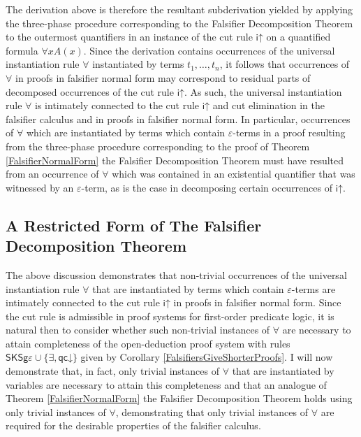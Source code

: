 \documentclass[10pt]{article}
\theoremstyle{definition}\newtheorem{remark}[theorem]{Remark}
\theoremstyle{definition}\newtheorem{example}[theorem]{Example}
\theoremstyle{definition}\newtheorem{definition}[theorem]{Definition}
\newcommand{\FalsifierCalculus}{{\mathsf{SKSg\varepsilon}}}
\newcommand{\iUp}{{\mathsf{i\mathord\uparrow}}}
\newcommand{\qcDown}{{\mathsf{qc\mathord\downarrow}}}
\begin{document}
	The derivation above is therefore the resultant subderivation yielded by applying the three-phase procedure corresponding to the Falsifier Decomposition Theorem to the outermost quantifiers in an instance of the cut rule $\iUp$ on a quantified formula $\forall x A(x)$. Since the derivation contains occurrences of the universal instantiation rule $\forall$ instantiated by terms $t_1, \dots, t_n$, it follows that occurrences of $\forall$ in proofs in falsifier normal form may correspond to residual parts of decomposed occurrences of the cut rule $\iUp$. As such, the universal instantiation rule $\forall$ is intimately connected to the cut rule $\iUp$ and cut elimination in the falsifier calculus and in proofs in falsifier normal form. In particular, occurrences of $\forall$ which are instantiated by terms which contain $\varepsilon$-terms in a proof resulting from the three-phase procedure corresponding to the proof of Theorem \ref{FalsifierNormalForm} the Falsifier Decomposition Theorem must have resulted from an occurrence of $\forall$ which was contained in an existential quantifier that was witnessed by an $\varepsilon$-term, as is the case in decomposing certain occurrences of $\iUp$.
	
	\subsection{A Restricted Form of The Falsifier Decomposition Theorem}\label{RestrictedFalsifierSection}

	The above discussion demonstrates that non-trivial occurrences of the universal instantiation rule $\forall$ that are instantiated by terms which contain $\varepsilon$-terms are intimately connected to the cut rule $\iUp$ in proofs in falsifier normal form. Since the cut rule is admissible in proof systems for first-order predicate logic, it is natural then to consider whether such non-trivial instances of $\forall$ are necessary to attain completeness of the open-deduction proof system with rules $\FalsifierCalculus \cup \{\exists, \qcDown\}$ given by Corollary \ref{FalsifiersGiveShorterProofs}. I will now demonstrate that, in fact, only trivial instances of $\forall$ that are instantiated by variables are necessary to attain this completeness and that an analogue of Theorem \ref{FalsifierNormalForm} the Falsifier Decomposition Theorem holds using only trivial instances of $\forall$, demonstrating that only trivial instances of $\forall$ are required for the desirable properties of the falsifier calculus.
\end{document}
